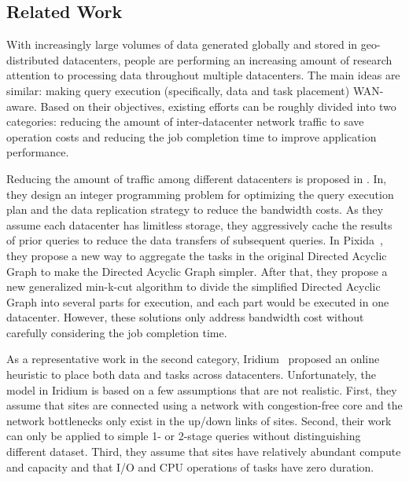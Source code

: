 \documentclass[base.tex]{subfiles}
\begin{document}
\subsection{Related Work}
\iffalse
Previously, the amount of data is limited, KB, MB are the units always seen when describing the amount. However, innovation of data storing technique and frequent worldwide communication promote data sharing. Thus, not only the amount of data, but also the co-operate of processing massive data is gaining its attention. 
\fi
With increasingly large volumes of data generated globally and stored in geo-distributed datacenters, people are performing an increasing amount of research attention to processing data throughout multiple datacenters. The main ideas are similar: making query execution (specifically, data and task placement) WAN-aware. Based on their objectives, existing efforts can be roughly divided into two categories: reducing the amount of inter-datacenter network traffic to save operation costs and reducing the job completion time to improve application performance.

Reducing the amount of traffic among different datacenters is proposed in \cite{vulimiri2015global, kloudas2015pixida}. In\cite{vulimiri2015global}, they design an integer programming problem for optimizing the query execution plan and the data replication strategy to reduce the bandwidth costs. As they assume each datacenter has limitless storage, they aggressively cache the results of prior queries to reduce the data transfers of subsequent queries. In Pixida~\cite{kloudas2015pixida}, they propose a new way to aggregate the tasks in the original Directed Acyclic Graph to make the Directed Acyclic Graph simpler. After that, they propose a new generalized min-k-cut algorithm to divide the simplified Directed Acyclic Graph into several parts for execution, and each part would be executed in one datacenter. However, these solutions only address bandwidth cost without carefully considering the job completion time.

As a representative work in the second category, Iridium~\cite{pu2015low} proposed an online heuristic to place both data and tasks across datacenters. Unfortunately, the model in Iridium is based on a few assumptions that are not realistic. First, they assume that sites are connected using a network with congestion-free core and the network bottlenecks only exist in the up/down links of sites. Second, their work can only be applied to simple 1- or 2-stage queries without distinguishing different dataset. Third, they assume that sites have relatively abundant compute and capacity and that I/O and CPU operations of tasks have zero duration.
\end{document}
